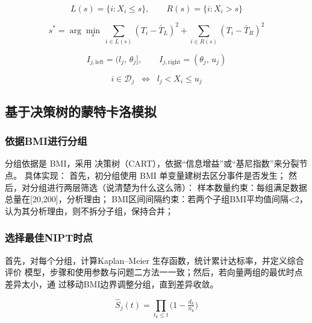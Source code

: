 \documentclass[withoutpreface,notoc]{cumcmthesis}
\begin{document}
	\begin{equation*}
		L(s)=\{i: X_i\le s\},\qquad R(s)=\{i: X_i> s\}
	\end{equation*}

	\begin{equation*}
		s^*=\arg\min_s\ \sum_{i\in L(s)}(T_i-\bar T_{L})^2 + \sum_{i\in R(s)}(T_i-\bar T_{R})^2
	\end{equation*}

	\begin{equation*}
		I_{j,\text{left}} = (l_j,\,\theta_j],\qquad I_{j,\text{right}} = (\theta_j,\,u_j)
	\end{equation*}

	\begin{equation*}
		i\in \mathcal{D}_j \;\;\Leftrightarrow\;\; l_j < X_i \le u_j
	\end{equation*}









	\subsection{基于决策树的蒙特卡洛模拟}


	
	\subsubsection{依据BMI进行分组}

	分组依据是 BMI，采用 决策树（CART），依据“信息增益”或“基尼指数”来分裂节点。
	具体实现：
	首先，初分组使用 BMI 单变量建树去区分事件是否发生；
	然后，对分组进行两层筛选（说清楚为什么这么筛）：
	样本数量约束：每组满足数据总量在[20,200]，分析理由；
	BMI区间间隔约束：若两个子组BMI平均值间隔<2，认为其分析理由，则不拆分子组，保持合并；


	\subsubsection{选择最佳NIPT时点}

	首先，对每个分组，计算Kaplan–Meier 生存函数，统计累计达标率，并定义综合评价
	模型，步骤和使用参数与问题二方法一一致；然后，若向量两组的最优时点差异太小，通
	过移动BMI边界调整分组，直到差异收敛。

	\begin{equation*}
		\hat S_j(t) = \prod_{t_k \le t} \Big(1 - \tfrac{d_k}{n_k}\Big)
	\end{equation*}
\end{document}
